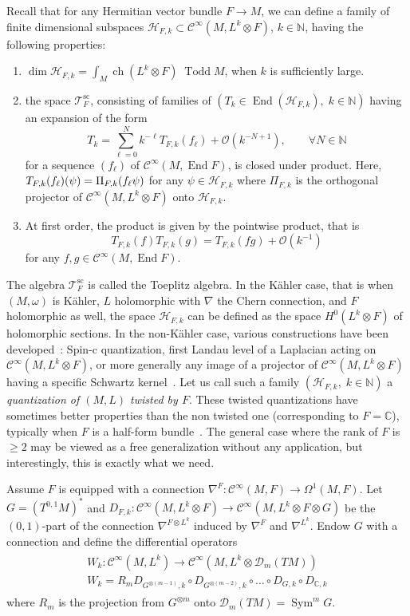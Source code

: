 \documentclass[10pt,a4paper]{article}
\theoremstyle{definition}
\numberwithin{equation}{section}
\newcommand{\N}{{\mathbb{N}}}
\newcommand{\C}{{\mathbb{C}}}
\newcommand{\om}{{\omega}}
\newcommand{\Om}{\Omega}
\newcommand{\op}{\operatorname}
\newcommand{\Ci}{{\mathcal{C}}^{\infty}}
\newcommand{\bigo}{\mathcal{O}}
\newcommand{\D}{\mathcal{D}}
\newcommand{\Hilb}{\mathcal{H}}
\newcommand{\clT}{\mathcal{T}}
\let\oldforall\forall
\renewcommand*{\forall}{\mathrel{\oldforall}}
\begin{document}
Recall that for any Hermitian vector bundle $F \rightarrow M $, we can define a family of finite dimensional subspaces $\Hilb_{F,k} \subset \Ci (M, L^k \otimes F)$, $k
\in \N$, having the following properties:
\begin{enumerate}
\item $\op{dim} \Hilb_{F,k} = \int_M \op{ch} (L^k \otimes F) \; \op{Todd} M$, when $k$ is sufficiently large.
\item the space $\clT_F^{\op{sc}}$, consisting of families of $(T_k \in \op{End} (\Hilb_{F,k}), \; k \in \N)$ having an expansion of the form
\[
T_k = \sum_{\ell = 0 }^N k^{-\ell} T_{F,k} (f_{\ell}) + \bigo \left(k^{-N+1}\right), \qquad
\forall N \in \N
\]
for a sequence $(f_\ell)$ of $\Ci (M, \op{End} F)$, is closed under product. Here, $T_{F,k} (f_{\ell}) (\psi)\linebreak = \Pi_{F,k} (f_{\ell} \psi)$ for any $\psi
\in \Hilb_{F,k} $ where $\Pi_{F,k}$ is the orthogonal projector of $\Ci (M, L^k
\otimes F)$ onto $\Hilb_{F,k}$.
\item At first order, the product is given by the pointwise product, that is 
\[
T_{F,k} (f) T_{F,k} (g) = T_{F,k} (fg) + \bigo \left(k^{-1}\right)
\]
for any $f,g \in \Ci (M,\op{End} F)$.
\end{enumerate}
The algebra $\clT_F^{\op{sc}}$ is called the Toeplitz algebra. In the K\"ahler case, that is when $(M, \om)$ is K\"ahler, $L$ holomorphic with $\nabla$ the Chern connection, and $F$ holomorphic as well, the space $\Hilb_{F,k}$ can be defined as the space $ H^0 (L^k \otimes F)$ of holomorphic sections. In the non-K\"ahler case, various constructions have been developed~\cite{BoUr96, MaMa}: Spin-c quantization, first Landau level of a Laplacian acting on $\Ci (M, L^k
\otimes F)$, or more generally any image of a projector of $\Ci (M, L^k
\otimes F)$ having a specific Schwartz kernel~\cite{oim}. Let us call such a family $(\Hilb_{F,k}, \; k \in \N)$ a {\em quantization of $(M,L)$ twisted by $F$}. These twisted quantizations have sometimes better properties than the non twisted one (corresponding to $F=\C$), typically when $F$ is a half-form bundle~\cite{oim_eq}. The general case where the rank of $F$ is $\geqslant 2$ may be viewed as a free generalization without any application, but interestingly, this is exactly what we need.

Assume $F$ is equipped with a connection $\nabla^F : \Ci (M, F) \rightarrow
\Om^1 (M, F)$. Let $G = (T^{0,1}M)^*$ and $D_{F,k} : \Ci (M, L^k \otimes F) \rightarrow \Ci (M, L^k
\otimes F \otimes G) $ be the $(0,1)$-part of the connection $\nabla^{F \otimes L^k}$ induced by $\nabla^F$ and $\nabla^{L^k}$. Endow $G$ with a connection and define the differential operators
\begin{gather}\label{eq:def_w_k}
\begin{split}
W_k : \Ci \left(M, L^k\right) \rightarrow \Ci \left(M, L^k \otimes \D_m (TM)\right)\\
W_k = R_m D_{G^{\otimes (m-1)},k} \circ D_{G^{\otimes (m-2)},k} \circ \ldots \circ D_{G, k} \circ D_{\C,k}
\end{split}
\end{gather}
where $R_m$ is the projection from $G^{\otimes m }$ onto $\D_m (TM) =
\op{Sym}^m G$.
\end{document}
